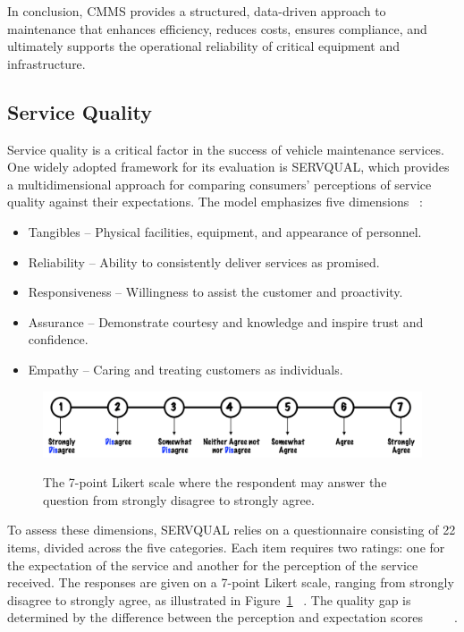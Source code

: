 In conclusion, \ac{CMMS} provides a structured, data-driven approach to maintenance that enhances efficiency, reduces costs, ensures compliance, and ultimately supports the operational reliability of critical equipment and infrastructure.





\subsection{Service Quality}

Service quality is a critical factor in the success of vehicle maintenance services. One widely adopted framework for its evaluation is SERVQUAL, which provides a multidimensional approach for comparing consumers’ perceptions of service quality against their expectations. The model emphasizes five dimensions ~\cite{SERVQUAL_OLD}:


\begin{itemize}
   \item Tangibles – Physical facilities, equipment, and appearance of personnel.
   \item Reliability – Ability to consistently deliver services as promised.
   \item Responsiveness – Willingness to assist the customer and proactivity.
   \item Assurance – Demonstrate courtesy and knowledge and inspire trust and confidence.
   \item Empathy – Caring and treating customers as individuals.
  \end{itemize}

\begin{figure}[h]
  \caption{The 7-point Likert scale where the respondent may answer the question from strongly disagree to strongly agree. ~\cite{master_servqual_model}}
  \centering
  \includegraphics[width=\textwidth]{figs/likert_scale}
  \label{fig:likert_scale}
\end{figure}


To assess these dimensions, SERVQUAL relies on a questionnaire consisting of 22 items, divided across the five categories. Each item requires two ratings: one for the expectation of the service and another for the perception of the service received. The responses are given on a 7-point Likert scale, ranging from strongly disagree to strongly agree, as illustrated in Figure~\ref{fig:likert_scale} ~\cite{Measuring_After_sales_Service_Quality}. The quality gap is determined by the difference between the perception and expectation scores ~\cite{servqual_blog_da_qualidade} ~\cite{Measuring_After_sales_Service_Quality} ~\cite{SERVQUAL_OLD}.

